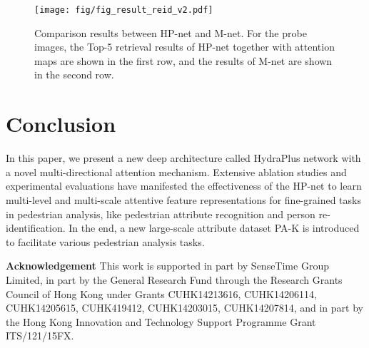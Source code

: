 \documentclass[10pt,twocolumn,letterpaper]{article}
\begin{document}
\begin{figure}[t]
\small
\centering
\texttt{[image: fig/fig\_result\_reid\_v2.pdf]}
\caption{
Comparison results between HP-net and M-net. For the probe images, the Top-5 retrieval results of HP-net together with attention maps are shown in the first row, and the results of M-net are shown in the second row.
}
\label{fig:result_reid}
\end{figure}



\section{Conclusion}
\label{sec:conclusion}
\vspace{-0.1cm}
In this paper, we present a new deep architecture called HydraPlus network with a novel multi-directional attention mechanism.
Extensive ablation studies and experimental evaluations have manifested the effectiveness of the HP-net to learn multi-level and multi-scale attentive feature representations for fine-grained tasks in pedestrian analysis, like pedestrian attribute recognition and person re-identification.
In the end, a new large-scale attribute dataset PA-K is introduced to facilitate various pedestrian analysis tasks.

\vspace{+5pt}
\noindent\textbf{Acknowledgement} This work is supported in part by SenseTime Group Limited, in part by the General Research Fund through the Research Grants Council of Hong Kong under Grants CUHK14213616, CUHK14206114, CUHK14205615, CUHK419412, CUHK14203015, CUHK14207814, and in part by the Hong Kong Innovation and Technology Support Programme Grant ITS/121/15FX.





{\small


}
\end{document}
